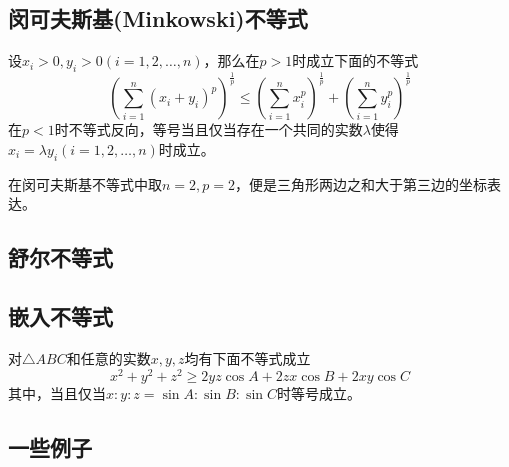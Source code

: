\subsection{闵可夫斯基(Minkowski)不等式}


\begin{theorem}[闵可夫斯基不等式]
  设$x_i>0, y_i>0 (i=1,2,\ldots,n)$，那么在$p>1$时成立下面的不等式
  \begin{equation}
    \label{eq:minkowski-inequation}
    \left( \sum_{i=1}^n(x_i+y_i)^p \right)^{\frac{1}{p}} \leqslant \left( \sum_{i=1}^nx_i^p \right)^{\frac{1}{p}} + \left( \sum_{i=1}^ny_i^p \right)^{\frac{1}{p}}
  \end{equation}
  在$p<1$时不等式反向，等号当且仅当存在一个共同的实数$\lambda$使得$x_i=\lambda y_i(i=1,2,\ldots,n)$时成立。
\end{theorem}
在闵可夫斯基不等式中取$n=2,p=2$，便是三角形两边之和大于第三边的坐标表达。

\subsection{舒尔不等式}
\label{sec:schur-inequality}



\subsection{嵌入不等式}
\label{sec:embedding-inequality}

\begin{theorem}[嵌入不等式]
  对$\triangle ABC$和任意的实数$x,y,z$均有下面不等式成立
  \begin{equation}
    \label{eq:embedding-inequation}
    x^2+y^2+z^2 \geqslant 2yz\cos{A}+2zx\cos{B}+2xy\cos{C}
  \end{equation}
  其中，当且仅当$x:y:z = \sin{A} : \sin{B} : \sin{C}$时等号成立。
\end{theorem}

\subsection{一些例子}
\label{sec:some-inequality-example}

